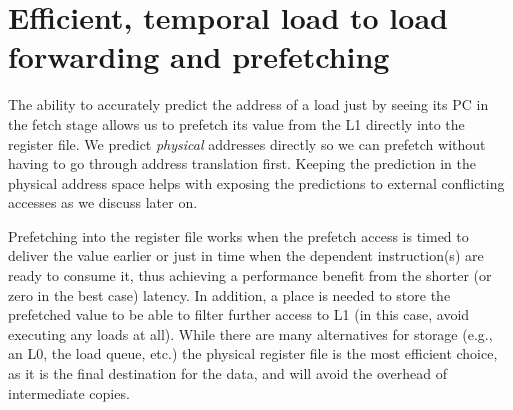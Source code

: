 \documentclass{sig-alternate}
\begin{document}

























\section{Efficient, temporal load to load forwarding and prefetching}

The ability to accurately predict the address of a load just by seeing its PC in the fetch stage allows us to prefetch its value from the L1 directly into the register file. 
We predict \emph{physical} addresses directly so we can prefetch without having to go through address translation first. Keeping the prediction in the physical address space helps with exposing the predictions to external conflicting accesses as we discuss later on. 

Prefetching into the register file works when the prefetch access is timed to deliver the value earlier or just in time when the dependent instruction(s) are ready to consume it, thus achieving a performance benefit from the shorter (or zero in the best case) latency. 
In addition, a place is needed to store the prefetched value to be able to filter further access to L1 (in this case, avoid executing any loads at all). While there are many alternatives for storage (e.g., an L0, the load queue, etc.) the physical register file is the most efficient choice, as it is the final destination for the data, and will avoid the overhead of intermediate copies. 
\end{document}
